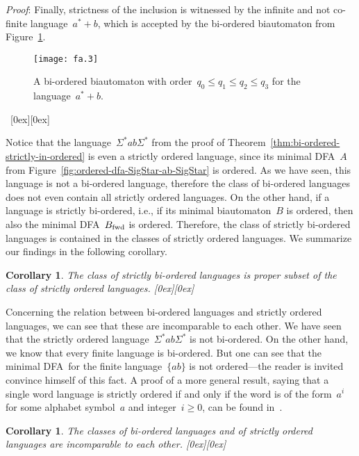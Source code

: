 \documentclass[submission]{eptcs}
\newcommand{\dfa}{\textrm{DFA}}
\newcommand{\fwd}{{\textnormal{fwd}}}
\newcommand*{\qed}{\raisebox{0.5ex}[0ex][0ex]{\framebox[1ex][l]{}}}
\newtheorem{corollary}[theorem]{Corollary}
\newenvironment{proof}{\par\noindent
  {\rmfamily\itshape\mdseries Proof\/}:\hspace{\labelsep}\ignorespaces}{\mbox{}\nolinebreak\hfill~{\qed}
  \medbreak
}
\begin{document}
\begin{proof}
  Finally, strictness of the inclusion is witnessed by the infinite
  and not co-finite language~$a^*+b$, which is accepted by the
  bi-ordered biautomaton from
  Figure~\ref{fig:ordered-biaut-for-a-star-plus-b}.
\begin{figure}[b]
    \centering
    \texttt{[image: fa.3]}
    \caption{A bi-ordered biautomaton with order~$q_0\leq q_1\leq q_2\leq q_3$
      for the language~$a^*+b$.}
    \label{fig:ordered-biaut-for-a-star-plus-b}
  \end{figure}
\end{proof}

Notice that the language~$\Sigma^* ab \Sigma^*$ from the proof of
Theorem~\ref{thm:bi-ordered-strictly-in-ordered} is even a strictly
ordered language, since its minimal \dfa~$A$ from
Figure~\ref{fig:ordered-dfa-SigStar-ab-SigStar} is ordered.  As we
have seen, this language is not a bi-ordered language, therefore the
class of bi-ordered languages does not even contain all strictly
ordered languages.  On the other hand, if a language is strictly
bi-ordered, i.e., if its minimal biautomaton~$B$ is ordered, then also
the minimal \dfa~$B_\fwd$ is ordered.  Therefore, the class of
strictly bi-ordered languages is contained in the classes of strictly
ordered languages.  We summarize our findings in the following
corollary.

\begin{corollary}\label{cor:strictly-bi-ordered-strictly-in-strictly-ordered}
  The class of strictly bi-ordered languages is proper subset of 
  the class of strictly ordered languages.  \hfill \qed
\end{corollary}

Concerning the relation between bi-ordered languages and
strictly ordered languages, we can see that these are incomparable to
each other.  We have seen that the strictly ordered language~$\Sigma^*
ab \Sigma^*$ is not bi-ordered.  On the other hand, we know that every
finite language is bi-ordered.  But one can see that the minimal \dfa\
for the finite language~$\{ab\}$ is not ordered---the reader is
invited convince himself of this fact.  A proof of a more general
result, saying that a single word language is strictly ordered if and
only if the word is of the form~$a^i$ for some alphabet symbol~$a$ and
integer~$i\geq 0$, can be found in~\cite{ShTh74}.

\begin{corollary}
  The classes of bi-ordered languages and of strictly ordered
  languages are incomparable to each other.  \hfill \qed
\end{corollary}
\end{document}
